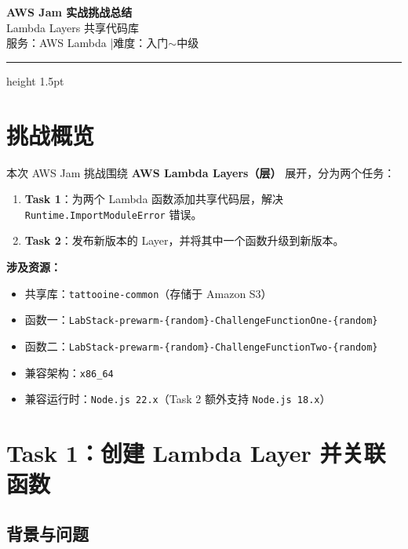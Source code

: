 \documentclass[12pt, a4paper]{article}
\begin{document}
\begin{center}
  {\LARGE \textbf{\color{awsorange} AWS Jam 实战挑战总结}} \\[0.5em]
  {\large Lambda Layers 共享代码库} \\[0.3em]
  {\small \color{gray} 服务：AWS Lambda \quad|\quad 难度：入门$\sim$中级}
\end{center}

\vspace{0.5em}
\hrule height 1.5pt
\vspace{1em}

\section{挑战概览}

本次 AWS Jam 挑战围绕 \textbf{AWS Lambda Layers（层）} 展开，分为两个任务：

\begin{enumerate}
  \item \textbf{Task 1}：为两个 Lambda 函数添加共享代码层，解决 \texttt{Runtime.ImportModuleError} 错误。
  \item \textbf{Task 2}：发布新版本的 Layer，并将其中一个函数升级到新版本。
\end{enumerate}

\textbf{涉及资源：}
\begin{itemize}
  \item 共享库：\texttt{tattooine-common}（存储于 Amazon S3）
  \item 函数一：\texttt{LabStack-prewarm-\{random\}-ChallengeFunctionOne-\{random\}}
  \item 函数二：\texttt{LabStack-prewarm-\{random\}-ChallengeFunctionTwo-\{random\}}
  \item 兼容架构：\texttt{x86\_64}
  \item 兼容运行时：\texttt{Node.js 22.x}（Task 2 额外支持 \texttt{Node.js 18.x}）
\end{itemize}

\section{Task 1：创建 Lambda Layer 并关联函数}

\subsection{背景与问题}
\end{document}
